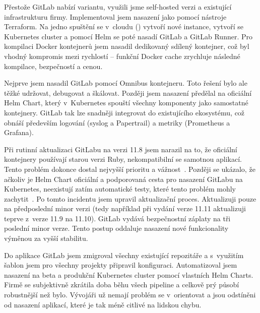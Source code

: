     Přestože GitLab nabízí  variantu, využili jsme self-hosted verzi a existující infrastrukturu firmy. Implementoval jsem nasazení jako  pomocí nástroje Terraform. Na jedno spuštění se v~cloudu () vytvoří nové instance, vytvoří se Kubernetes cluster a pomocí Helm se poté nasadí GitLab a GitLab Runner. Pro kompilaci Docker kontejnerů jsem nasadil dedikovaný sdílený  kontejner, což byl vhodný kompromis mezi rychlostí -- funkční Docker cache zrychluje následné kompilace, bezpečností a cenou.

    Nejprve jsem nasadil GitLab pomocí Omnibus kontejneru. Toto řešení bylo ale těžké udržovat, debugovat a škálovat. Později jsem nasazení předělal na oficiální Helm Chart, který v~Kubernetes spouští všechny komponenty jako samostatné kontejnery. GitLab tak lze snadněji integrovat do existujícího ekosystému, což obnáší především logování (syslog a Papertrail) a metriky (Prometheus a Grafana).

    Při rutinní aktualizaci GitLabu na verzi 11.8 jsem narazil na to, že oficiální kontejnery používají starou verzi Ruby, nekompatibilní se samotnou aplikací. Tento problém dokonce dostal nejvyšší prioritu a vážnost~\cite{gitlab-issue-chart}. Později se ukázalo, že ačkoliv je Helm Chart oficiální a podporovaná cesta pro nasazení GitLabu na Kubernetes, neexistují zatím automatické testy, které tento problém mohly zachytit~\cite{gitlab-issue-qa}. Po tomto incidentu jsem upravil aktualizační proces. Aktualizuji pouze na předposlední minor verzi (tedy například při vydání verze 11.11 aktualizuji teprve z~verze 11.9 na 11.10). GitLab vydává bezpečnostní záplaty na tři poslední minor verze. Tento postup oddaluje nasazení nové funkcionality výměnou za vyšší stabilitu.

    Do aplikace GitLab jsem zmigroval všechny existující repozitáře a s~využitím šablon jsem pro všechny projekty připravil \CI konfiguraci. Automatizoval jsem nasazení na beta a produkční Kubernetes cluster pomocí vlastních Helm Charts. Firmě se subjektivně zkrátila doba běhu všech pipeline a celkově prý působí \CI robustnější než bylo. Vývojáři už nemají problém se v~\CI orientovat a jsou odstíněni od nasazení aplikací, které je tak méně citlivé na lidskou chybu.
